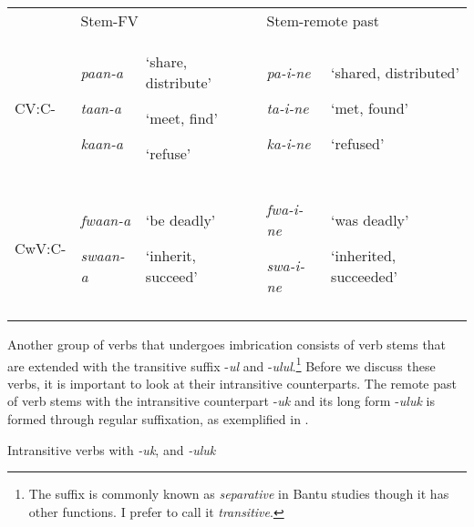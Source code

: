 \documentclass[output=paper]{langsci/langscibook}
\begin{document}
\begin{tabular}{lllll} & \multicolumn{2}{l}{\mdseries Stem-FV} & \multicolumn{2}{l}{\mdseries Stem-remote past}\\
\lsptoprule
\mdseries CV:C- & {\mdseries \emph{paan-a}}

{\mdseries \emph{taan-a}}

\mdseries \emph{kaan-a} & {\mdseries ‘share, distribute’}

{\mdseries ‘meet, find’}

\mdseries ‘refuse’ & {\mdseries \emph{pa-i-ne}}

{\mdseries \emph{ta-i-ne}}

\mdseries \emph{ka-i-ne} & {\mdseries ‘shared, distributed’}

{\mdseries ‘met, found’}

\mdseries ‘refused’\\
\mdseries CwV:C- & {\mdseries \emph{fwaan-a}}

\mdseries \emph{swaan-a} & {\mdseries ‘be deadly’}

\mdseries ‘inherit, succeed’ & {\mdseries \emph{fwa-i-ne}}

\mdseries \emph{swa-i-ne} & {\mdseries ‘was deadly’}

\mdseries ‘inherited, succeeded’\\
\lspbottomrule
\end{tabular}
Another group of verbs that undergoes imbrication consists of verb stems that are extended with the transitive suffix -\textit{ul }and -\textit{ulul}.\footnote{ The suffix is commonly known as \emph{separative} in Bantu studies though it has other functions. I prefer to call it \emph{transitive}.} Before we discuss these verbs, it is important to look at their intransitive counterparts. The remote past of verb stems with the intransitive counterpart -\textit{uk} and its long form -\textit{uluk} is formed through regular suffixation, as exemplified in .

\begin{stylelsTableHeading}%
\begin{table}
\caption{Intransitive verbs with \textit{{}-uk}, and \textit{{}-uluk}}
\label{tab:22}
\end{table}\end{stylelsTableHeading}
\end{document}
